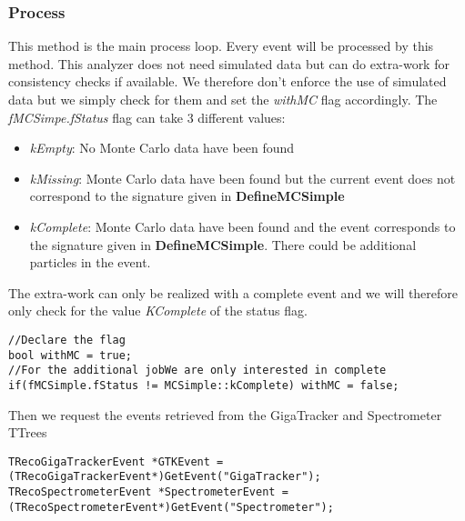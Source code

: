 \documentclass{article}
\newcommand{\method}[1]{\textbf{#1}}
\newcommand{\var}[1]{\textit{#1}}
\begin{document}
\subsubsection{Process}
This method is the main process loop. Every event will be processed by this method. This analyzer
does not need simulated data but can do extra-work for consistency checks if available. We therefore
don't enforce the use of simulated data but we simply check for them and set the \var{withMC}
flag accordingly. The \var{fMCSimpe.fStatus} flag can take 3 different values:
\begin{itemize}
  \item \var{kEmpty}: No Monte Carlo data have been found
  \item \var{kMissing}: Monte Carlo data have been found but the current event does not correspond
  to the signature given in \method{DefineMCSimple} 
  \item \var{kComplete}: Monte Carlo data have been found and the event corresponds to the signature
  given in \method{DefineMCSimple}. There could be additional particles in the event.
\end{itemize}
The extra-work can only be realized with a complete event and we will therefore only check for the
value \var{KComplete} of the status flag.

\begin{lstlisting}
//Declare the flag
bool withMC = true;
//For the additional jobWe are only interested in complete 
if(fMCSimple.fStatus != MCSimple::kComplete) withMC = false;
\end{lstlisting}

Then we request the events retrieved from the GigaTracker and Spectrometer TTrees
\begin{lstlisting}
TRecoGigaTrackerEvent *GTKEvent = (TRecoGigaTrackerEvent*)GetEvent("GigaTracker");
TRecoSpectrometerEvent *SpectrometerEvent = (TRecoSpectrometerEvent*)GetEvent("Spectrometer");
\end{lstlisting}
\end{document}
